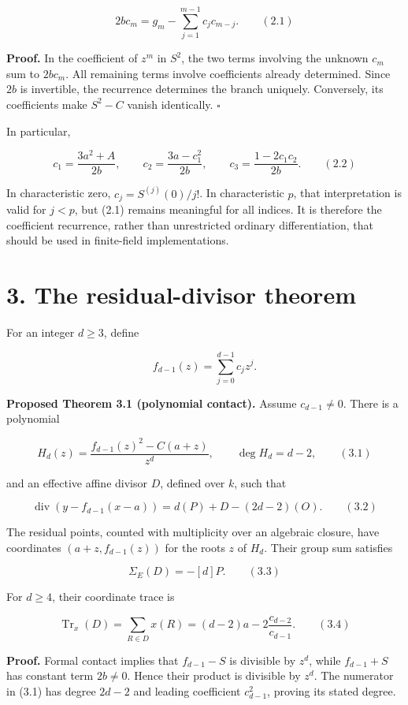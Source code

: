 \documentclass[
  11pt,
  a4paper,
]{article}
\begin{document}
\[
2b c_m=g_m-\sum_{j=1}^{m-1}c_jc_{m-j}. \qquad (2.1)
\]

\textbf{Proof.} In the coefficient of \(z^m\) in \(S^2\), the two terms
involving the unknown \(c_m\) sum to \(2bc_m\). All remaining terms
involve coefficients already determined. Since \(2b\) is invertible, the
recurrence determines the branch uniquely. Conversely, its coefficients
make \(S^2-C\) vanish identically. \(\square\)

In particular,

\[
c_1=\frac{3a^2+A}{2b},\qquad c_2=\frac{3a-c_1^2}{2b},\qquad c_3=\frac{1-2c_1c_2}{2b}. \qquad (2.2)
\]

In characteristic zero, \(c_j=S^{(j)}(0)/j!\). In characteristic \(p\),
that interpretation is valid for \(j<p\), but (2.1) remains meaningful
for all indices. It is therefore the coefficient recurrence, rather than
unrestricted ordinary differentiation, that should be used in
finite-field implementations.

\section{3. The residual-divisor
theorem}\label{the-residual-divisor-theorem}

For an integer \(d\geq3\), define

\[
f_{d-1}(z)=\sum_{j=0}^{d-1}c_jz^j.
\]

\textbf{Proposed Theorem 3.1 (polynomial contact).} Assume
\(c_{d-1}\neq0\). There is a polynomial

\[
H_d(z)=\frac{f_{d-1}(z)^2-C(a+z)}{z^d},\qquad \deg H_d=d-2, \qquad (3.1)
\]

and an effective affine divisor \(D\), defined over \(k\), such that

\[
\operatorname{div}(y-f_{d-1}(x-a))=d(P)+D-(2d-2)(O). \qquad (3.2)
\]

The residual points, counted with multiplicity over an algebraic
closure, have coordinates \((a+z,f_{d-1}(z))\) for the roots \(z\) of
\(H_d\). Their group sum satisfies

\[
\Sigma_E(D)=-[d]P. \qquad (3.3)
\]

For \(d\geq4\), their coordinate trace is

\[
\operatorname{Tr}_x(D)=\sum_{R\in D}x(R)=(d-2)a-2\frac{c_{d-2}}{c_{d-1}}. \qquad (3.4)
\]

\textbf{Proof.} Formal contact implies that \(f_{d-1}-S\) is divisible
by \(z^d\), while \(f_{d-1}+S\) has constant term \(2b\neq0\). Hence
their product is divisible by \(z^d\). The numerator in (3.1) has degree
\(2d-2\) and leading coefficient \(c_{d-1}^2\), proving its stated
degree.
\end{document}
